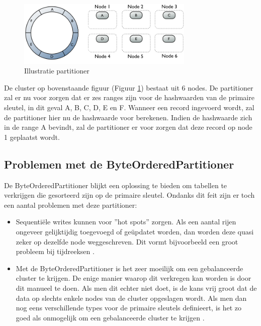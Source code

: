 \begin{figure}[H]
	\centering
	\includegraphics[width=0.75\textwidth]{img/4_architectuur/partitioner}
	\caption{Illustratie partitioner \citep{DataStax2016Partitioner}}
	\label{fig:partitioner}
\end{figure}

De cluster op bovenstaande figuur (Figuur \ref{fig:partitioner}) bestaat uit 6 nodes.
De partitioner zal er nu voor zorgen dat er zes ranges zijn voor de hashwaarden van de primaire sleutel, in dit geval A, B, C, D, E en F.
Wanneer een record ingevoerd wordt, zal de partitioner hier nu de hashwaarde voor berekenen.
Indien de hashwaarde zich in de range A bevindt, zal de partitioner er voor zorgen dat deze record op node 1 geplaatst wordt.

\subsection{Problemen met de ByteOrderedPartitioner}
De ByteOrderedPartitioner blijkt een oplossing te bieden om tabellen te verkrijgen die gesorteerd zijn op de primaire sleutel.
Ondanks dit feit zijn er toch een aantal problemen met deze partitioner:

\begin{itemize}
	\item Sequentiële writes kunnen voor ''hot spots'' zorgen.
	Als een aantal rijen ongeveer gelijktijdig toegevoegd of geüpdatet worden, dan worden deze quasi zeker op dezelfde node weggeschreven.
	Dit vormt bijvoorbeeld een groot probleem bij tijdreeksen \citep{kan2014cassandra}.
	
	\item Met de ByteOrderedPartitioner is het zeer moeilijk om een gebalanceerde cluster te krijgen.
	De enige manier waarop dit verkregen kan worden is door dit manueel te doen.
	Als men dit echter niet doet, is de kans vrij groot dat de data op slechts enkele nodes van de cluster opgeslagen wordt.
	Als men dan nog eens verschillende types voor de primaire sleutels definieert, is het zo goed als onmogelijk om een gebalanceerde cluster te krijgen
	\citep{Bauer2013CaseAgainstByteOrder}.
\end{itemize}

